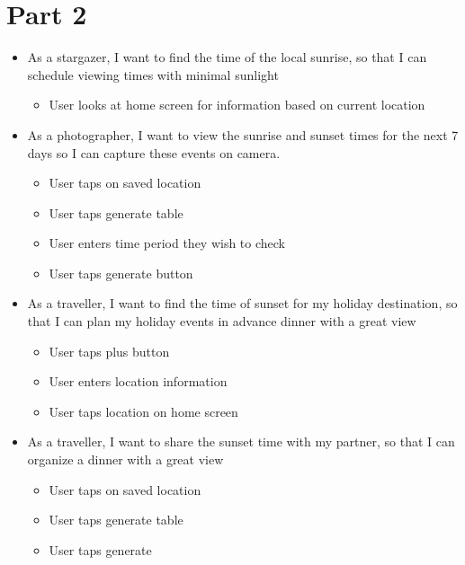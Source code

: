 \documentclass{scrartcl}
\begin{document}
\pagebreak

\section*{Part 2}
\begin{itemize}
    \item As a stargazer, I want to find the time of the local sunrise, so that I can schedule viewing times with minimal sunlight
    \begin{itemize}
        \item User looks at home screen for information based on current location
    \end{itemize}
    \item As a photographer, I want to view the sunrise and sunset times for the next 7 days so I can capture these events on camera.
    \begin{itemize}
        \item User taps on saved location
        \item User taps generate table
        \item User enters time period they wish to check
        \item User taps generate button
    \end{itemize}
    \item As a traveller, I want to find the time of sunset for my holiday destination, so that I can plan my holiday events in advance dinner with a great view
    \begin{itemize}
        \item User taps plus button
        \item User enters location information
        \item User taps location on home screen
    \end{itemize}
    \item As a traveller, I want to share the sunset time with my partner, so that I can organize a dinner with a great view
    \begin{itemize}
        \item User taps on saved location
        \item User taps generate table
        \item User taps generate
    \end{itemize}
\end{itemize}
\end{document}

